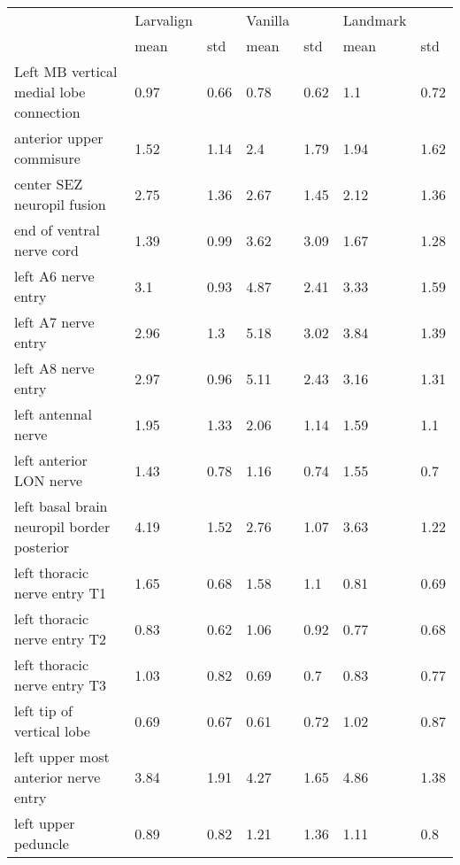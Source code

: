 \begin{tabular}{lllllll}
\hline
 ﻿                                           & Larvalign &      & Vanilla &      & Landmark &      \\
                                             & mean      & std  & mean    & std  & mean     & std  \\
 Left MB vertical medial lobe connection     & 0.97      & 0.66 & 0.78    & 0.62 & 1.1      & 0.72 \\
 anterior upper commisure                    & 1.52      & 1.14 & 2.4     & 1.79 & 1.94     & 1.62 \\
 center SEZ neuropil fusion                  & 2.75      & 1.36 & 2.67    & 1.45 & 2.12     & 1.36 \\
 end of ventral nerve cord                   & 1.39      & 0.99 & 3.62    & 3.09 & 1.67     & 1.28 \\
 left A6 nerve entry                         & 3.1       & 0.93 & 4.87    & 2.41 & 3.33     & 1.59 \\
 left A7 nerve entry                         & 2.96      & 1.3  & 5.18    & 3.02 & 3.84     & 1.39 \\
 left A8 nerve entry                         & 2.97      & 0.96 & 5.11    & 2.43 & 3.16     & 1.31 \\
 left antennal nerve                         & 1.95      & 1.33 & 2.06    & 1.14 & 1.59     & 1.1  \\
 left anterior LON nerve                     & 1.43      & 0.78 & 1.16    & 0.74 & 1.55     & 0.7  \\
 left basal brain neuropil border posterior  & 4.19      & 1.52 & 2.76    & 1.07 & 3.63     & 1.22 \\
 left thoracic nerve entry T1                & 1.65      & 0.68 & 1.58    & 1.1  & 0.81     & 0.69 \\
 left thoracic nerve entry T2                & 0.83      & 0.62 & 1.06    & 0.92 & 0.77     & 0.68 \\
 left thoracic nerve entry T3                & 1.03      & 0.82 & 0.69    & 0.7  & 0.83     & 0.77 \\
 left tip of vertical lobe                   & 0.69      & 0.67 & 0.61    & 0.72 & 1.02     & 0.87 \\
 left upper most anterior nerve entry        & 3.84      & 1.91 & 4.27    & 1.65 & 4.86     & 1.38 \\
 left upper peduncle                         & 0.89      & 0.82 & 1.21    & 1.36 & 1.11     & 0.8  \\

\end{tabular}
